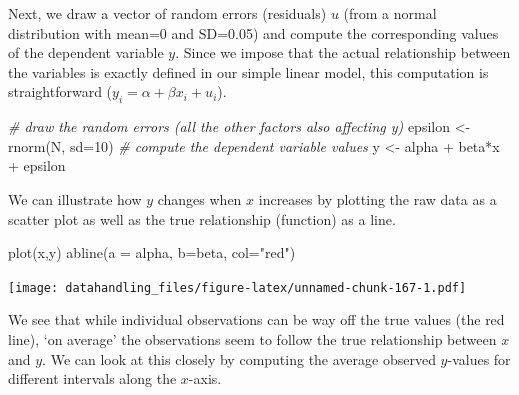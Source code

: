 \documentclass[
  12pt,
]{style/krantz}
\newenvironment{Shaded}{\begin{snugshade}}{\end{snugshade}}
\newcommand{\AttributeTok}[1]{\textcolor[rgb]{0.77,0.63,0.00}{#1}}
\newcommand{\CommentTok}[1]{\textcolor[rgb]{0.56,0.35,0.01}{\textit{#1}}}
\newcommand{\DecValTok}[1]{\textcolor[rgb]{0.00,0.00,0.81}{#1}}
\newcommand{\FunctionTok}[1]{\textcolor[rgb]{0.00,0.00,0.00}{#1}}
\newcommand{\NormalTok}[1]{#1}
\newcommand{\OtherTok}[1]{\textcolor[rgb]{0.56,0.35,0.01}{#1}}
\newcommand{\SpecialCharTok}[1]{\textcolor[rgb]{0.00,0.00,0.00}{#1}}
\newcommand{\StringTok}[1]{\textcolor[rgb]{0.31,0.60,0.02}{#1}}
\begin{document}
Next, we draw a vector of random errors (residuals) \(u\) (from a normal distribution with mean=0 and SD=0.05) and compute the corresponding values of the dependent variable \(y\). Since we impose that the actual relationship between the variables is exactly defined in our simple linear model, this computation is straightforward (\(y_{i}= \alpha + \beta x_{i} + u_{i}\)).

\begin{Shaded}
\begin{Highlighting}[]
\CommentTok{\# draw the random errors (all the other factors also affecting y)}
\NormalTok{epsilon }\OtherTok{\textless{}{-}} \FunctionTok{rnorm}\NormalTok{(N, }\AttributeTok{sd=}\DecValTok{10}\NormalTok{)}
\CommentTok{\# compute the dependent variable values}
\NormalTok{y }\OtherTok{\textless{}{-}}\NormalTok{ alpha }\SpecialCharTok{+}\NormalTok{ beta}\SpecialCharTok{*}\NormalTok{x }\SpecialCharTok{+}\NormalTok{ epsilon}
\end{Highlighting}
\end{Shaded}

We can illustrate how \(y\) changes when \(x\) increases by plotting the raw data as a scatter plot as well as the true relationship (function) as a line.

\begin{Shaded}
\begin{Highlighting}[]
\FunctionTok{plot}\NormalTok{(x,y)}
\FunctionTok{abline}\NormalTok{(}\AttributeTok{a =}\NormalTok{ alpha, }\AttributeTok{b=}\NormalTok{beta, }\AttributeTok{col=}\StringTok{"red"}\NormalTok{)}
\end{Highlighting}
\end{Shaded}

\texttt{[image: datahandling\_files/figure-latex/unnamed-chunk-167-1.pdf]}

We see that while individual observations can be way off the true values (the red line), `on average' the observations seem to follow the true relationship between \(x\) and \(y\). We can look at this closely by computing the average observed \(y\)-values for different intervals along the \(x\)-axis.
\end{document}
